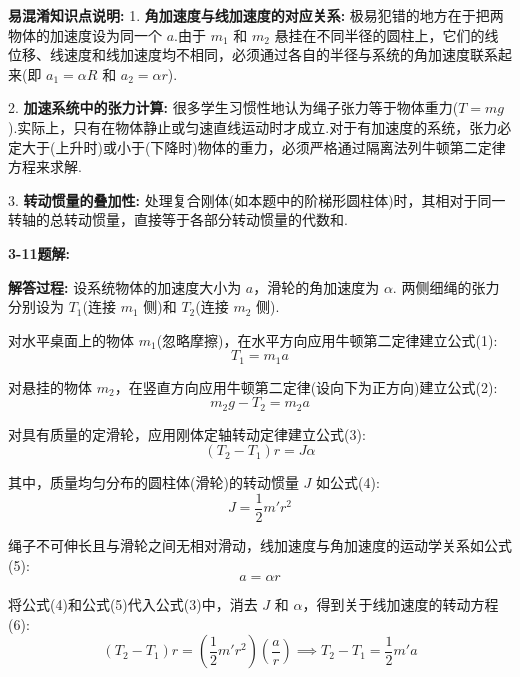 \vspace{1em}

\textbf{易混淆知识点说明:}
1. \textbf{角加速度与线加速度的对应关系:} 极易犯错的地方在于把两物体的加速度设为同一个 $a$.由于 $m_1$ 和 $m_2$ 悬挂在不同半径的圆柱上，它们的线位移、线速度和线加速度均不相同，必须通过各自的半径与系统的角加速度联系起来(即 $a_1 = \alpha R$ 和 $a_2 = \alpha r$).

2. \textbf{加速系统中的张力计算:} 很多学生习惯性地认为绳子张力等于物体重力($T=mg$).实际上，只有在物体静止或匀速直线运动时才成立.对于有加速度的系统，张力必定大于(上升时)或小于(下降时)物体的重力，必须严格通过隔离法列牛顿第二定律方程来求解.

3. \textbf{转动惯量的叠加性:} 处理复合刚体(如本题中的阶梯形圆柱体)时，其相对于同一转轴的总转动惯量，直接等于各部分转动惯量的代数和.

\vspace{2em}

\textbf{3-11题解:}


\textbf{解答过程:}
设系统物体的加速度大小为 $a$，滑轮的角加速度为 $\alpha$.
两侧细绳的张力分别设为 $T_1$(连接 $m_1$ 侧)和 $T_2$(连接 $m_2$ 侧).

对水平桌面上的物体 $m_1$(忽略摩擦)，在水平方向应用牛顿第二定律建立公式(1):
\begin{equation}
	T_1 = m_1 a
\end{equation}

对悬挂的物体 $m_2$，在竖直方向应用牛顿第二定律(设向下为正方向)建立公式(2):
\begin{equation}
	m_2 g - T_2 = m_2 a
\end{equation}

对具有质量的定滑轮，应用刚体定轴转动定律建立公式(3):
\begin{equation}
	(T_2 - T_1)r = J\alpha
\end{equation}

其中，质量均匀分布的圆柱体(滑轮)的转动惯量 $J$ 如公式(4):
\begin{equation}
	J = \frac{1}{2}m'r^2
\end{equation}

绳子不可伸长且与滑轮之间无相对滑动，线加速度与角加速度的运动学关系如公式(5):
\begin{equation}
	a = \alpha r
\end{equation}

将公式(4)和公式(5)代入公式(3)中，消去 $J$ 和 $\alpha$，得到关于线加速度的转动方程(6):
\begin{equation}
	(T_2 - T_1)r = \left(\frac{1}{2}m'r^2\right) \left(\frac{a}{r}\right) \implies T_2 - T_1 = \frac{1}{2}m'a
\end{equation}

